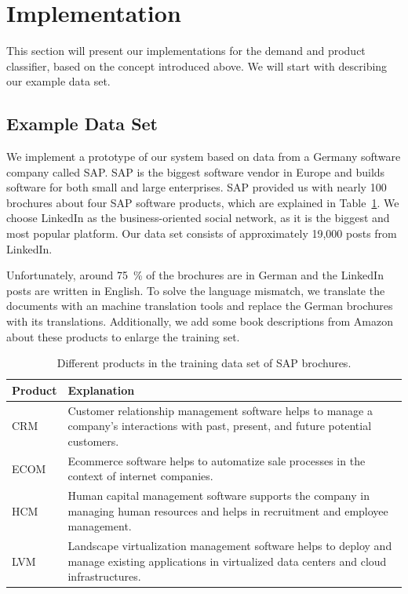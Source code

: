 
\section{Implementation}
\label{sec:implementation}

This section will present our implementations for the demand and product classifier, based on the concept introduced above.
We will start with describing our example data set.

\subsection{Example Data Set}
\label{sub:initial_data_set}
We implement a prototype of our \nto system based on data from a Germany software company called SAP.
SAP is the biggest software vendor in Europe and builds software for both small and large enterprises.
SAP provided us with nearly 100 brochures about four SAP software products, which are explained in Table~\ref{table:products}.
We choose LinkedIn as the business-oriented social network, as it is the biggest and most popular platform.
Our data set consists of approximately 19,000 posts from LinkedIn.

Unfortunately, around 75~\% of the brochures are in German and the LinkedIn posts are written in English.
To solve the language mismatch, we translate the documents with an machine translation tools and replace the German brochures with its translations.
Additionally, we add some book descriptions from Amazon about these products to enlarge the training set.

\begin{table}[h]
	\centering
	{
		\renewcommand\arraystretch{1.25}
		\begin{tabular}{lll}
			\hline
			\textbf{Product} & \multicolumn{2}{l}{\textbf{Explanation}} \\
			\hline\hline
			CRM  & \multicolumn{2}{p{10cm}}{\raggedright
				Customer relationship management software helps to manage a company's interactions with past, present, and future potential customers.} \\
			\hline
			ECOM  & \multicolumn{2}{p{10cm}}{\raggedright
				Ecommerce software helps to automatize sale processes in the context of internet companies.} \\
			\hline
			HCM  & \multicolumn{2}{p{10cm}}{\raggedright
				Human capital management software supports the company in managing human resources and helps in recruitment and employee management.} \\
			\hline
			LVM  & \multicolumn{2}{p{10cm}}{\raggedright
				Landscape virtualization management software helps to deploy and manage existing applications in virtualized data centers and cloud infrastructures.} \\
			\hline
		\end{tabular}
	}
	\caption{Different products in the training data set of SAP brochures.}
	\label{table:products}
\end{table}

